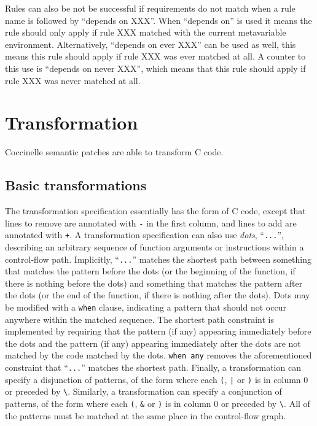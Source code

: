 Rules can also be not be successful if requirements do not match
when a rule name is followed by ``depends on XXX''. When ``depends on'' is used
it means the rule should only apply if rule XXX matched with the current
metavariable environment. Alternatively, ``depends on ever XXX'' can be used
as well, this means this rule should apply if rule XXX was ever matched at
all. A counter to this use is ``depends on never XXX'', which means that this
rule should apply if rule XXX was never matched at all.

\section{Transformation}

Coccinelle semantic patches are able to transform C code.

\subsection{Basic transformations}

The transformation specification essentially has the form of C code, except
that lines to remove are annotated with \verb+-+ in the first column, and
lines to add are annotated with \verb-+-.  A transformation specification
can also use {\em dots}, ``\verb-...-'', describing an arbitrary sequence
of function arguments or instructions within a control-flow path.
Implicitly, ``\verb-...-'' matches the shortest path between something that
matches the pattern before the dots (or the beginning of the function, if
there is nothing before the dots) and something that matches the pattern
after the dots (or the end of the function, if there is nothing after the
dots).  Dots may be modified with a {\tt when} clause, indicating a pattern
that should not occur anywhere within the matched sequence.  The shortest
path constraint is implemented by requiring that the pattern (if any)
appearing immediately before the dots and the pattern (if any) appearing
immediately after the dots are not matched by the code matched by the dots.
{\tt when any}
removes the aforementioned constraint that ``\verb-...-'' matches the
shortest path.  Finally, a transformation can specify a disjunction of
patterns, of the form  where each \texttt{(}, \texttt{|} or \texttt{)} is
in column 0 or preceded by \texttt{\textbackslash}.
Similarly, a transformation can specify a conjunction of
patterns, of the form  where each \texttt{(}, \texttt{\&} or \texttt{)} is
in column 0 or preceded by \texttt{\textbackslash}.  All of the patterns
must be matched at the same place in the control-flow graph.

